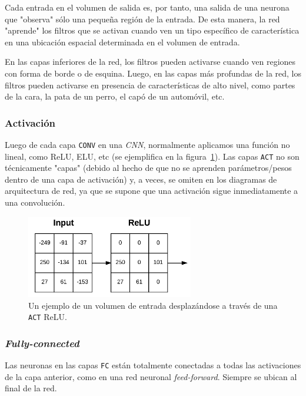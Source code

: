 \documentclass[a4paper,12pt]{article}
\begin{document}
Cada entrada en el volumen de salida es, por tanto, una salida de una neurona que "observa" sólo una pequeña región de la entrada. De esta manera, la red "aprende" los filtros que se activan cuando ven un tipo específico de característica en una ubicación espacial determinada en el volumen de entrada.

En las capas inferiores de la red, los filtros pueden activarse cuando ven regiones con forma de borde o de esquina. Luego, en las capas más profundas de la red, los filtros pueden activarse en presencia de características de alto nivel, como partes de la cara, la pata de un perro, el capó de un automóvil, etc.

\subsubsection{Activación}

Luego de cada capa \texttt{CONV} en una \textit{CNN}, normalmente aplicamos una función no lineal, como ReLU, ELU, etc (se ejemplifica en la figura~\ref{fig:relu-act}). Las capas \texttt{ACT} no son técnicamente "capas" (debido al hecho de que no se aprenden parámetros/pesos dentro de una capa de activación) y, a veces, se omiten en los diagramas de arquitectura de red, ya que se supone que una activación sigue inmediatamente a una convolución.

\begin{figure}[H]
	\begin{center}				
	\includegraphics[width=0.65\textwidth]{tesis_47.png}
  	\caption{Un ejemplo de un volumen de entrada desplazándose a través de una \texttt{ACT} ReLU.}
  	\label{fig:relu-act}
  	\end{center}
\end{figure}

\subsubsection{\textit{Fully-connected}}
Las neuronas en las capas \texttt{FC} están totalmente conectadas a todas las activaciones de la capa anterior, como en una red neuronal \textit{feed-forward}. Siempre se ubican al final de la red.
\end{document}
